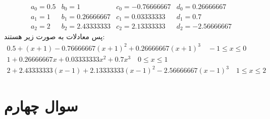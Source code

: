 \documentclass[]{article}
\begin{document}
\[
\begin{array}{cccc}
    a_0 = 0.5 & b_0 = 1 & c_0 = -0.76666667 & d_0 = 0.26666667\\
    a_1 = 1 & b_1 = 0.26666667 & c_1 = 0.03333333 & d_1 = 0.7\\
    a_2 = 2 & b_2 = 2.43333333 & c_2 = 2.13333333 & d_2 = -2.56666667
\end{array}
\]
پس معادلات به صورت زیر هستند:
\begin{gather*}
    0.5 + (x + 1) -0.76666667 (x + 1)^2 + 0.26666667 (x + 1)^3 \quad -1 \le x \le 0\\
    1 + 0.26666667 x + 0.03333333x^2 + 0.7 x^3 \quad 0 \le x \le 1\\
    2 + 2.43333333 (x - 1) + 2.13333333 (x-1)^2 -2.56666667 (x - 1)^3 \quad 1 \le x \le 2
\end{gather*}
\section*{سوال چهارم}
\end{document}
